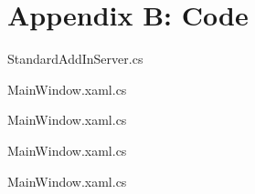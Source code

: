 \documentclass[12pt, letterpaper]{article}
\begin{document}
\newpage
\section{Appendix B: Code}
StandardAddInServer.cs

\newpage
MainWindow.xaml.cs

\newpage
MainWindow.xaml.cs

\newpage
MainWindow.xaml.cs

\newpage
MainWindow.xaml.cs

\end{document}
